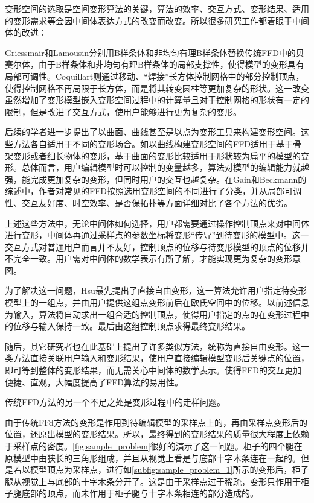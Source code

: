     变形空间的选取是空间变形算法的关键，算法的效率、交互方式、变形结果、适用的变形需求等会因中间体表达方式的改变而改变。所以很多研究工作都着眼于中间体的改进：

    Griessmair\cite{Griessmair89}和Lamousin\cite{lamousin1994}分别用B样条体和非均匀有理B样条体替换传统FFD\cite{Sederberg86}中的贝赛尔体，由于B样条体和非均匀有理B样条体的局部支撑性，使得模型的变形具有局部可调性。Coquillart\cite{coquillart1990}则通过移动、“焊接”长方体控制网格中的部分控制顶点，使得控制网格不再局限于长方体，而是将其转变圆柱等更加复杂的形状。这一改变虽然增加了变形模型嵌入变形空间过程中的计算量且对于控制网格的形状有一定的限制，但是改进了交互方式，使用户能够进行更为复杂的变形。

    后续的学者进一步提出了以曲面、曲线甚至是以点为变形工具来构建变形空间。这些方法各自适用于不同的变形场合。如以曲线构建变形空间的FFD适用于基于骨架变形或者细长物体的变形，基于曲面的变形比较适用于形状较为扁平的模型的变形。总体而言，用户编辑模型时可以控制的变量越多，算法对模型的编辑能力就越强，能完成更加复杂的变形，但同时用户的交互也越复杂。在Gain和Beckmann的综述\cite{Gain08}中，作者对常见的FFD按照选用变形空间的不同进行了分类，并从局部可调性、交互友好度、时空效率、是否保拓扑等方面详细对比了各个方法的优劣。

    上述这些方法中，无论中间体如何选择，用户都需要通过操作控制顶点来对中间体进行变形，中间体再通过采样点的参数坐标将变形“传导”到待变形的模型中。这一交互方式对普通用户而言并不友好，控制顶点的位移与待变形模型的顶点的位移并不完全一致。用户需对中间体的数学表示有所了解，才能实现更为复杂的变形意图。

    为了解决这一问题，Hsu\cite{hsu1992}最先提出了直接自由变形，这一算法允许用户指定待变形模型上的一组点，并由用户提供这组点变形前后在欧氏空间中的位移。以前述信息为输入，算法将自动求出一组合适的控制顶点，使得用户指定的点的在变形过程中的位移与输入保持一致。最后由这组控制顶点求得最终变形结果。

    随后，其它研究者也在此基础上提出了许多类似方法，统称为直接自由变形。这一类方法直接关联用户输入和变形结果，使用户直接编辑模型变形后关键点的位置，即可等到整体的变形结果，而无需关心中间体的数学表示。使得FFD的交互更加便捷、直观，大幅度提高了FFD算法的易用性。

    传统FFD方法的另一个不足之处是变形过程中的走样问题。

    由于传统FFd方法的变形是作用到待编辑模型的采样点上的，再由采样点变形后的位置，还原出模型的变形结果。所以，最终得到的变形结果的质量很大程度上依赖于采样点的密度。\autoref{fig:sample_problem}很好的演示了这一问题。柜子的四个腿在原模型中由狭长的三角形组成，并且从视觉上看是与底部十字木条连在一起的。但是若以模型顶点为采样点，进行如\autoref{subfig:sample_problem_1}所示的变形后，柜子腿从视觉上与底部的十字木条分开了。这是由于采样点过于稀疏，变形只作用于柜子腿底部的顶点，而未作用于柜子腿与十字木条相连的部分造成的。

